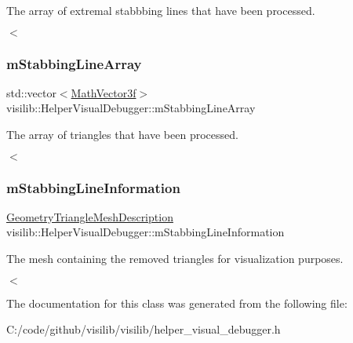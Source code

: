 The array of extremal stabbbing lines that have been processed. 

$<$ \mbox{\label{classvisilib_1_1_helper_visual_debugger_a642e381b6e255a1ca570114fc4433a95}} 
\subsubsection{\texorpdfstring{mStabbingLineArray}{mStabbingLineArray}}
{\footnotesize\ttfamily std\+::vector$<$\mbox{\hyperlink{classvisilib_1_1_math_vector3__}{Math\+Vector3f}}$>$ visilib\+::\+Helper\+Visual\+Debugger\+::m\+Stabbing\+Line\+Array\hspace{0.3cm}{\ttfamily [private]}}



The array of triangles that have been processed. 

$<$ \mbox{\label{classvisilib_1_1_helper_visual_debugger_ac5bc178cf799f6b894b26fe2cc9e20a2}} 
\subsubsection{\texorpdfstring{mStabbingLineInformation}{mStabbingLineInformation}}
{\footnotesize\ttfamily \mbox{\hyperlink{structvisilib_1_1_geometry_triangle_mesh_description}{Geometry\+Triangle\+Mesh\+Description}} visilib\+::\+Helper\+Visual\+Debugger\+::m\+Stabbing\+Line\+Information\hspace{0.3cm}{\ttfamily [private]}}



The mesh containing the removed triangles for visualization purposes. 

$<$ 

The documentation for this class was generated from the following file\+:\begin{DoxyCompactItemize}
\item 
C\+:/code/github/visilib/visilib/helper\+\_\+visual\+\_\+debugger.\+h\end{DoxyCompactItemize}
